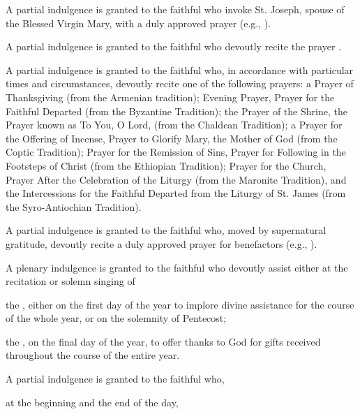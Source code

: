 \hypertarget{grant19}{}
A partial indulgence is granted to the faithful who invoke St. Joseph, spouse of the Blessed Virgin Mary, with a duly approved prayer (e.g., ).

\hypertarget{grant20}{}
A partial indulgence is granted to the faithful who devoutly recite the prayer .

\hypertarget{grant23}{}
 A partial indulgence is granted to the faithful who, in accordance with particular times and circumstances, devoutly recite one of the following prayers: a Prayer of Thanksgiving (from the Armenian tradition); Evening Prayer, Prayer for the Faithful Departed (from the Byzantine Tradition); the Prayer of the Shrine, the Prayer  known as To You, O Lord, (from the Chaldean Tradition); a Prayer for the Offering of Incense, Prayer to Glorify Mary, the Mother of God (from the Coptic Tradition); Prayer for the Remission of Sins, Prayer for Following in the Footsteps of Christ (from the Ethiopian Tradition); Prayer for the Church, Prayer After the Celebration of the Liturgy (from the Maronite Tradition), and the Intercessions for the Faithful Departed from the Liturgy of St. James (from the Syro-Antiochian Tradition).

\hypertarget{grant24}{}
A partial indulgence is granted to the faithful who, moved by supernatural gratitude, devoutly recite a duly approved prayer for benefactors (e.g., ).

\hypertarget{grant26}{}
 A plenary indulgence is granted to the faithful who devoutly assist either at the recitation or solemn singing of

 the , either on the first day of the year to implore divine assistance for the course of the whole year, or on the solemnity of Pentecost;

 the , on the final day of the year, to offer thanks to God for gifts received throughout the course of the entire year.

 A partial indulgence is granted to the faithful who,

 at the beginning and the end of the day,

